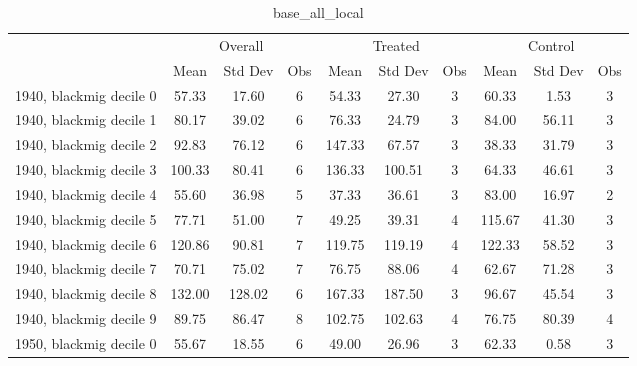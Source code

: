 \begin{table}[htbp]\centering
\def\sym#1{\ifmmode^{#1}\else\(^{#1}\)\fi}
\caption{base\_all\_local \label{tab1}}
\begin{tabular}{l*{3}{ccc}}
\toprule
                    &\multicolumn{3}{c}{Overall}           &\multicolumn{3}{c}{Treated}           &\multicolumn{3}{c}{Control}           \\
                    &        Mean&     Std Dev&         Obs&        Mean&     Std Dev&         Obs&        Mean&     Std Dev&         Obs\\
\midrule
1940, blackmig decile 0&       57.33&       17.60&           6&       54.33&       27.30&           3&       60.33&        1.53&           3\\
1940, blackmig decile 1&       80.17&       39.02&           6&       76.33&       24.79&           3&       84.00&       56.11&           3\\
1940, blackmig decile 2&       92.83&       76.12&           6&      147.33&       67.57&           3&       38.33&       31.79&           3\\
1940, blackmig decile 3&      100.33&       80.41&           6&      136.33&      100.51&           3&       64.33&       46.61&           3\\
1940, blackmig decile 4&       55.60&       36.98&           5&       37.33&       36.61&           3&       83.00&       16.97&           2\\
1940, blackmig decile 5&       77.71&       51.00&           7&       49.25&       39.31&           4&      115.67&       41.30&           3\\
1940, blackmig decile 6&      120.86&       90.81&           7&      119.75&      119.19&           4&      122.33&       58.52&           3\\
1940, blackmig decile 7&       70.71&       75.02&           7&       76.75&       88.06&           4&       62.67&       71.28&           3\\
1940, blackmig decile 8&      132.00&      128.02&           6&      167.33&      187.50&           3&       96.67&       45.54&           3\\
1940, blackmig decile 9&       89.75&       86.47&           8&      102.75&      102.63&           4&       76.75&       80.39&           4\\
1950, blackmig decile 0&       55.67&       18.55&           6&       49.00&       26.96&           3&       62.33&        0.58&           3\\

\end{tabular}
\end{table}
